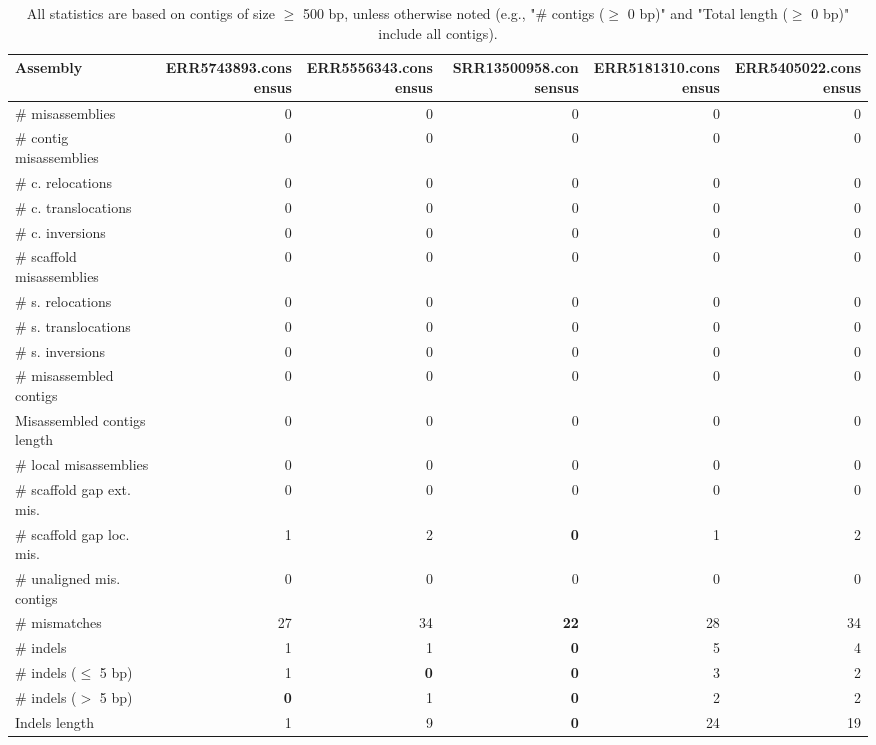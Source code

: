 \documentclass[12pt,a4paper]{article}
\begin{document}
\begin{table}[ht]
\begin{center}
\caption{All statistics are based on contigs of size $\geq$ 500 bp, unless otherwise noted (e.g., "\# contigs ($\geq$ 0 bp)" and "Total length ($\geq$ 0 bp)" include all contigs).}
\begin{tabular}{|l*{5}{|r}|}
\hline
Assembly & ERR5743893.consensus & ERR5556343.consensus & SRR13500958.consensus & ERR5181310.consensus & ERR5405022.consensus \\ \hline
\# misassemblies & 0 & 0 & 0 & 0 & 0 \\ \hline
\hspace{2mm}\# contig misassemblies & 0 & 0 & 0 & 0 & 0 \\ \hline
\hspace{5mm}\# c. relocations & 0 & 0 & 0 & 0 & 0 \\ \hline
\hspace{5mm}\# c. translocations & 0 & 0 & 0 & 0 & 0 \\ \hline
\hspace{5mm}\# c. inversions & 0 & 0 & 0 & 0 & 0 \\ \hline
\hspace{2mm}\# scaffold misassemblies & 0 & 0 & 0 & 0 & 0 \\ \hline
\hspace{5mm}\# s. relocations & 0 & 0 & 0 & 0 & 0 \\ \hline
\hspace{5mm}\# s. translocations & 0 & 0 & 0 & 0 & 0 \\ \hline
\hspace{5mm}\# s. inversions & 0 & 0 & 0 & 0 & 0 \\ \hline
\# misassembled contigs & 0 & 0 & 0 & 0 & 0 \\ \hline
Misassembled contigs length & 0 & 0 & 0 & 0 & 0 \\ \hline
\# local misassemblies & 0 & 0 & 0 & 0 & 0 \\ \hline
\# scaffold gap ext. mis. & 0 & 0 & 0 & 0 & 0 \\ \hline
\# scaffold gap loc. mis. & 1 & 2 & {\bf 0} & 1 & 2 \\ \hline
\# unaligned mis. contigs & 0 & 0 & 0 & 0 & 0 \\ \hline
\# mismatches & 27 & 34 & {\bf 22} & 28 & 34 \\ \hline
\# indels & 1 & 1 & {\bf 0} & 5 & 4 \\ \hline
\hspace{5mm}\# indels ($\leq$ 5 bp) & 1 & {\bf 0} & {\bf 0} & 3 & 2 \\ \hline
\hspace{5mm}\# indels ($>$ 5 bp) & {\bf 0} & 1 & {\bf 0} & 2 & 2 \\ \hline
Indels length & 1 & 9 & {\bf 0} & 24 & 19 \\ \hline
\end{tabular}
\end{center}
\end{table}
\end{document}
